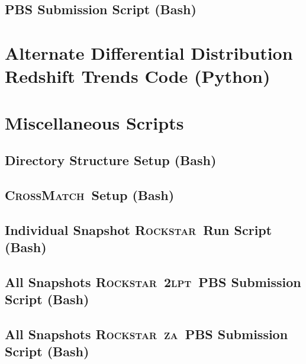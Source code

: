 \documentclass[12pt]{report}
\newcommand{\lpt}{\textsc{2lpt}}
\newcommand{\za}{\textsc{za}}
\newcommand{\rockstar}{\textsc{Rockstar}}
\newcommand{\crossmatch}{\textsc{CrossMatch}}
\begin{document}
\begin{appendices}
	\section{PBS Submission Script (Bash)}
	\label{app:run_mass_trends}
	

	\chapter{Alternate Differential Distribution Redshift Trends Code (Python)}
	\label{app:alt_redshift_trends}
	

	\chapter{Miscellaneous Scripts}
	\label{app:misc_scripts}
	\section{Directory Structure Setup (Bash)}
	\label{app:setup}
	
	\section{\crossmatch\ Setup (Bash)}
	\label{app:crossmatch_setup}
	
	\section{Individual Snapshot \rockstar\ Run Script (Bash)}
	\label{app:begin_run}
	
	\section{All Snapshots \rockstar\ \lpt\ PBS Submission Script (Bash)}
	\label{app:run_2lpt}
	
	\section{All Snapshots \rockstar\ \za\ PBS Submission Script (Bash)}
	\label{app:run_za}
	

\end{appendices}
\end{document}
